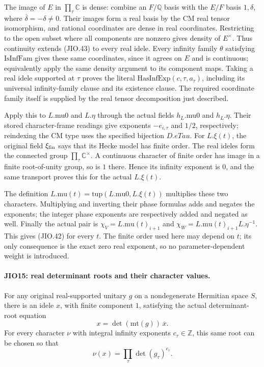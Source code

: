 The image of \(E\) in \(\prod_\tau\mathbb C\) is dense:
combine an \(F/\mathbb Q\) basis with the \(E/F\) basis
\(1,\delta\), where \(\overline\delta=-\delta\ne0\).
Their images form a real basis by the CM real tensor
isomorphism, and rational coordinates are dense in real
coordinates.  Restricting to the open subset
where all components are nonzero gives density of \(E^\times\).
Thus continuity extends (JIO.43) to every real idele.
Every infinity family \(\theta\) satisfying
\(\mathrm{IsInfFam}\) gives these same coordinates, since it
agrees on \(E\) and is continuous; equivalently apply the
same density argument to its component maps.
Taking a real idele supported at \(\tau\) proves the literal
\(\mathrm{HasInfExp}(c,\tau,a_\tau)\), including its universal
infinity-family clause and its existence clause.
The required coordinate family itself is supplied by the
real tensor decomposition just described.

Apply this to \(L.\mathrm{mu0}\) and \(L.\eta\) through the
actual fields \(h_L.\mathrm{mu0}\) and \(h_L.\eta\).
Their stored character-frame readings give exponents
\(-e_{i,\tau}\) and \(1/2\), respectively; reindexing the
CM type uses the specified bijection \(D.eTau\).
For \(L.\xi(t)\), the original field \(\xi_{\rm fin}\)
says that its Hecke model has finite order.  The real ideles
form the connected group \(\prod_\tau\mathbb C^\times\).
A continuous character of finite order has image in a finite
root-of-unity group, so is \(1\) there.  Hence its infinity
exponent is \(0\), and the same transport proves this for
the actual \(L.\xi(t)\).

The definition \(L.\mathrm{mu}(t)=\mathrm{tup}
(L.\mathrm{mu0},L.\xi(t))\) multiplies these two characters.
Multiplying and inverting their phase formulas adds and
negates the exponents; the integer phase exponents are
respectively added and negated as well.
Finally the actual pair is
\(\chi_V=L.\mathrm{mu}(t)_{i+1}\) and
\(\chi_W=L.\mathrm{mu}(t)_{i+1}L.\eta^{-1}\).
This gives (JIO.42) for every \(t\).  The finite order used
here may depend on \(t\); its only consequence is the exact
zero real exponent, so no parameter-dependent weight is
introduced.

\paragraph{JIO15: real determinant roots and their character values.}
\label{claim:JIO15}
For any original real-supported unitary \(g\) on a nondegenerate
Hermitian space \(S\), there is an idele \(x\), with finite
component \(1\), satisfying the actual determinant-root equation
\[
                  x=\det(\mathrm{mt}(g))\,\overline{x}.
 \tag{JIO.44}
\]
For every character \(\nu\) with integral infinity exponents
\(c_\tau\in\mathbb Z\), this same root can be chosen so that
\[
                         \nu(x)=\prod_\tau\det(g_\tau)^{c_\tau}.
 \tag{JIO.45}
\]

